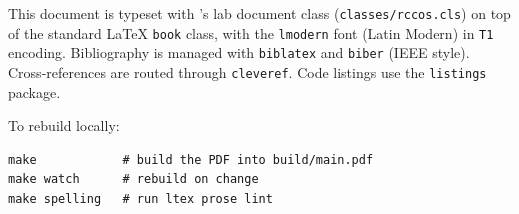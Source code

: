 This document is typeset with \RCCOS{}'s lab document class
(\texttt{classes/rccos.cls}) on top of the standard \LaTeX{}
\texttt{book} class, with the \texttt{lmodern} font
(Latin Modern) in \texttt{T1} encoding. Bibliography is
managed with \texttt{biblatex} and \texttt{biber} (IEEE
style). Cross-references are routed through \texttt{cleveref}.
Code listings use the \texttt{listings} package.

To rebuild locally:

\begin{lstlisting}[language=rccossh]
make            # build the PDF into build/main.pdf
make watch      # rebuild on change
make spelling   # run ltex prose lint
\end{lstlisting}
